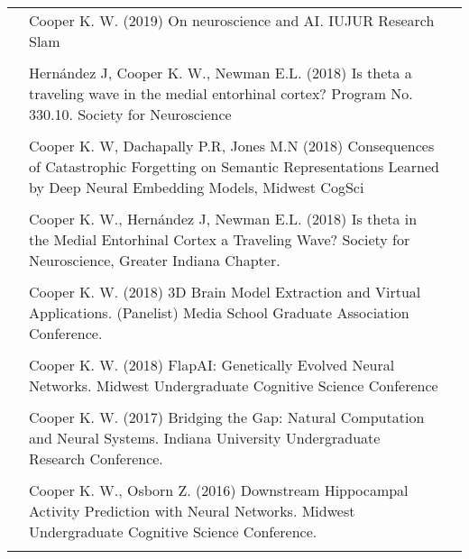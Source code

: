 \documentclass[11pt]{cooperCV_v1/cooperCV} %
\begin{document}
\begin{minipage}{\textwidth}
\begin{tabular}{ p{} %
                   p{} 
                   p{}}
  \small\textcolor{gray}{{\emph{  }}} & {Cooper K. W. (2019) On neuroscience and AI. IUJUR Research Slam} & {\hfill \small{ }} \\ \\
  
  \small\textcolor{gray}{{\emph{  }}} & {Hernández J, Cooper K. W., Newman E.L. (2018) Is theta a traveling wave in the medial entorhinal cortex? Program No. 330.10. Society for Neuroscience} & {\hfill \small{ }} \\ \\
  
  \small\textcolor{gray}{{\emph{  }}} & {Cooper K. W, Dachapally P.R, Jones M.N (2018) Consequences of Catastrophic Forgetting on Semantic Representations Learned by Deep Neural Embedding Models, Midwest CogSci} & {\hfill \small{ }} \\ \\
  
  \small\textcolor{gray}{{\emph{  }}} & {Cooper K. W., Hernández J, Newman E.L. (2018) Is theta in the Medial Entorhinal Cortex a Traveling Wave? Society for Neuroscience, Greater Indiana Chapter.} & {\hfill \small{ }} \\ \\
  
  \small\textcolor{gray}{{\emph{  }}} & {Cooper K. W. (2018) 3D Brain Model Extraction and Virtual Applications. (Panelist) Media School Graduate Association Conference.} & {\hfill \small{ }} \\ \\
  
  \small\textcolor{gray}{{\emph{  }}} & {Cooper K. W. (2018) FlapAI: Genetically Evolved Neural Networks. Midwest Undergraduate Cognitive Science Conference} & {\hfill \small{ }} \\ \\
  
  \small\textcolor{gray}{{\emph{  }}} & {Cooper K. W. (2017) Bridging the Gap: Natural Computation and Neural Systems. Indiana University Undergraduate Research Conference.} & {\hfill \small{ }} \\ \\
  
  \small\textcolor{gray}{{\emph{  }}} & {Cooper K. W., Osborn Z. (2016) Downstream Hippocampal Activity Prediction with Neural Networks. Midwest Undergraduate Cognitive Science Conference.} & {\hfill \small{ }} \\ \\
  
  \end{tabular}


%


\end{minipage}
\end{document}
